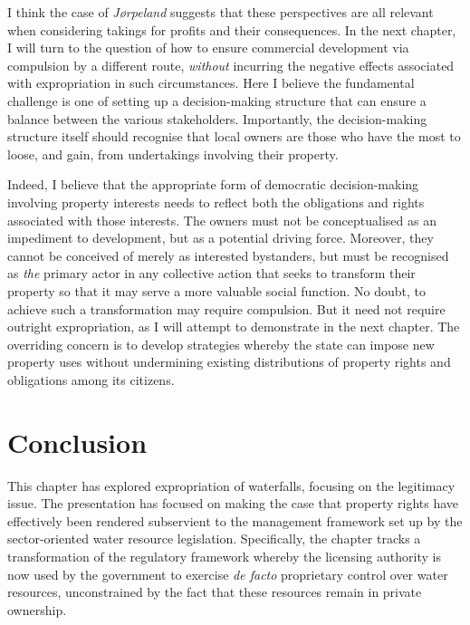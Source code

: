 {{I think the case of \emph{Jørpeland} suggests that these perspectives are all relevant when considering takings for profits and their consequences. In the next chapter, I will turn to the question of how to ensure commercial development via compulsion by a different route, {\it without} incurring the negative effects associated with expropriation in such circumstances. Here I believe the fundamental challenge is one of setting up a decision-making structure that can ensure a balance between the various stakeholders. Importantly, the decision-making structure itself should recognise that local owners are those who have the most to loose, and gain, from undertakings involving their property. 

Indeed, I believe that the appropriate form of democratic decision-making involving property interests needs to reflect both the obligations and rights associated with those interests. The owners must not be conceptualised as an impediment to development, but as a potential driving force. Moreover, they cannot be conceived of merely as interested bystanders, but must be recognised as {\it the} primary actor in any collective action that seeks to transform their property so that it may serve a more valuable social function. No doubt, to achieve such a transformation may require compulsion. But it need not require outright expropriation, as I will attempt to demonstrate in the next chapter. The overriding concern is to develop strategies whereby the state can impose new property uses without undermining existing distributions of property rights and obligations among its citizens.
} }
 
\section{Conclusion}\label{conc}

This chapter has explored expropriation of waterfalls, focusing on the legitimacy issue. The presentation has focused on making the case that property rights have effectively been rendered subservient to the management framework set up by the sector-oriented water resource legislation. Specifically, the chapter tracks a transformation of the regulatory framework whereby the licensing authority is now used by the government to exercise {\it de facto} proprietary control over water resources, unconstrained by the fact that these resources remain in private ownership.

